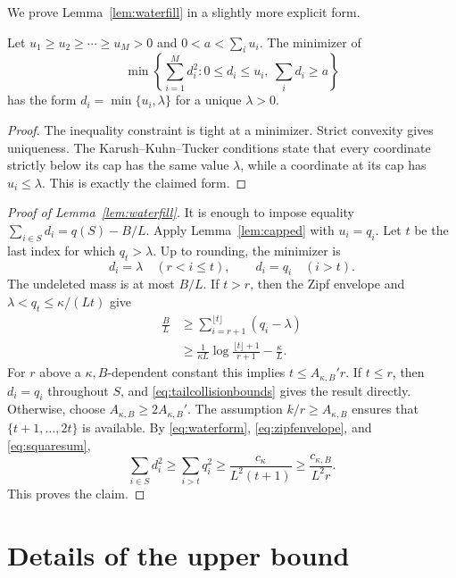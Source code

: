 We prove Lemma~\ref{lem:waterfill} in a slightly more explicit form.

\begin{lemma}
\label{lem:capped}
Let $u_1\geq u_2\geq\cdots\geq u_M>0$ and $0<a<\sum_i u_i$.
The minimizer of
\[
 \min\left\{\sum_{i=1}^M d_i^2:
 0\leq d_i\leq u_i,\ \sum_i d_i\geq a\right\}
\]
has the form $d_i=\min\{u_i,\lambda\}$ for a unique $\lambda>0$.
\end{lemma}

\begin{proof}
The inequality constraint is tight at a minimizer. Strict convexity gives
uniqueness. The Karush--Kuhn--Tucker conditions state that every coordinate
strictly below its cap has the same value $\lambda$, while a coordinate at
its cap has $u_i\leq\lambda$. This is exactly the claimed form.
\end{proof}

\begin{proof}[Proof of Lemma~\ref{lem:waterfill}]
It is enough to impose equality
$\sum_{i\in S}d_i=q(S)-B/L$. Apply Lemma~\ref{lem:capped} with
$u_i=q_i$. Let $t$ be the last index for which $q_t>\lambda$. Up to
rounding, the minimizer is
\[
 d_i=\lambda\quad(r<i\leq t),
 \qquad d_i=q_i\quad(i>t).                               \tag{30}\label{eq:waterform}
\]
The undeleted mass is at most $B/L$. If $t>r$, then the Zipf envelope and
$\lambda<q_t\leq\kappa/(Lt)$ give
\begin{align*}
 \frac{B}{L}
 &\geq\sum_{i=r+1}^{\lfloor t\rfloor}(q_i-\lambda)\\
 &\geq\frac1{\kappa L}
   \log\frac{\lfloor t\rfloor+1}{r+1}-\frac{\kappa}{L}.
\end{align*}
For $r$ above a $\kappa,B$-dependent constant this implies
$t\leq A_{\kappa,B}'r$. If $t\leq r$, then $d_i=q_i$ throughout $S$,
and \eqref{eq:tailcollisionbounds} gives the result directly. Otherwise,
choose $A_{\kappa,B}\geq2A_{\kappa,B}'$. The assumption
$k/r\geq A_{\kappa,B}$ ensures that $\{t+1,\ldots,2t\}$ is available.
By \eqref{eq:waterform}, \eqref{eq:zipfenvelope}, and
\eqref{eq:squaresum},
\[
 \sum_{i\in S}d_i^2
 \geq\sum_{i>t}q_i^2
 \geq\frac{c_\kappa}{L^2(t+1)}
 \geq\frac{c_{\kappa,B}}{L^2r}.
\]
This proves the claim.
\end{proof}

\section{Details of the upper bound}
\label{app:upper}

